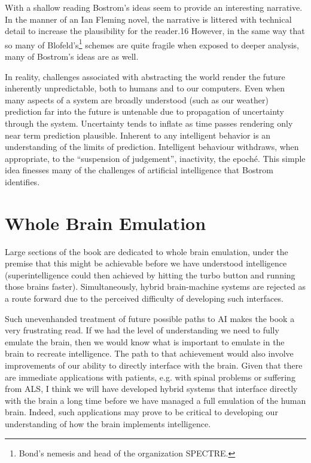 \documentclass[a4paper]{caesar_book}
\begin{document}
With a shallow reading Bostrom’s ideas seem to provide an interesting narrative. In the manner of an Ian Fleming novel, the narrative is littered with technical detail to increase the plausibility for the reader.16 However, in the same way that so many of Blofeld’s\footnote{Bond’s nemesis and head of the organization SPECTRE.} schemes are quite fragile when exposed to deeper analysis, many of Bostrom’s ideas are as well.

In reality, challenges associated with abstracting the world render the future inherently unpredictable, both to humans and to our computers. Even when many aspects of a system are broadly understood (such as our weather) prediction far into the future is untenable due to propagation of uncertainty through the system. Uncertainty tends to inflate as time passes rendering only near term prediction plausible. Inherent to any intelligent behavior is an understanding of the limits of prediction. Intelligent behaviour withdraws, when appropriate, to the ``suspension of judgement'', inactivity, the epoché. This simple idea finesses many of the challenges of artificial intelligence that Bostrom identifies.

\section{Whole Brain Emulation}

Large sections of the book are dedicated to whole brain emulation, under the premise that this might be achievable before we have understood intelligence (superintelligence could then achieved by hitting the turbo button and running those brains faster). Simultaneously, hybrid brain-machine systems are rejected as a route forward due to the perceived difficulty of developing such interfaces.

Such unevenhanded treatment of future possible paths to AI makes the book a very frustrating read. If we had the level of understanding we need to fully emulate the brain, then we would know what is important to emulate in the brain to recreate intelligence. The path to that achievement would also involve improvements of our ability to directly interface with the brain. Given that there are immediate applications with patients, e.g. with spinal problems or suffering from ALS, I think we will have developed hybrid systems that interface directly with the brain a long time before we have managed a full emulation of the human brain. Indeed, such applications may prove to be critical to developing our understanding of how the brain implements intelligence.
\end{document}
